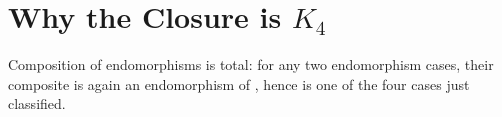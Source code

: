 \documentclass[11pt]{article}
\begin{document}
\begin{code}
\AgdaSymbol{)}\AgdaSpace{}%
\AgdaSpace{}%
\AgdaSpace{}%
\AgdaSpace{}%
\AgdaSpace{}%
\<%
\\
\>[0]\AgdaSpace{}%
\AgdaSpace{}%
\AgdaSpace{}%
\AgdaSpace{}%
\AgdaSymbol{=}\<%
\\
\>[0][@{}l@{\AgdaIndent{0}}]%
\>[2]\AgdaSpace{}%
\AgdaSymbol{(}\AgdaSpace{}%
\AgdaSymbol{)}\AgdaSpace{}%
\<%
\\
\>[2][@{}l@{\AgdaIndent{0}}]%
\>[4]\AgdaSpace{}%
\AgdaSpace{}%
\AgdaSpace{}%
\AgdaSpace{}%
\AgdaSymbol{(}\AgdaSpace{}%
\AgdaSymbol{(}\AgdaSpace{}%
\AgdaSpace{}%
\AgdaSymbol{))}\AgdaSpace{}%
\AgdaSymbol{(}\AgdaSpace{}%
\AgdaSymbol{))}\<%
\end{code}

\section{Why the Closure is \texorpdfstring{$K_4$}{K4}}

Composition of endomorphisms is total: for any two endomorphism cases,
their composite is again an endomorphism of , hence
is one of the four cases just classified.
\end{document}
